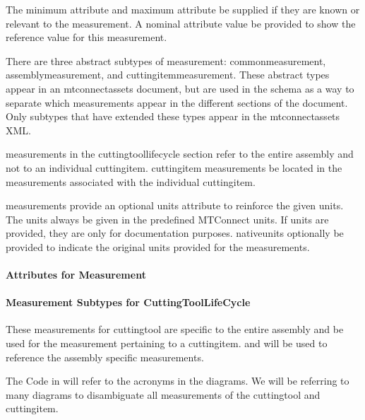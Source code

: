 The \gls{minimum attribute} and \gls{maximum attribute} \MAY be supplied if they are known or relevant to the \gls{measurement}.  A \gls{nominal attribute} value \MAY be provided to show the reference value for this \gls{measurement}.

There are three abstract subtypes of  \gls{measurement}: \gls{commonmeasurement}, \gls{assemblymeasurement}, and \gls{cuttingitemmeasurement}.  These abstract types \MUSTNOT appear in an \gls{mtconnectassets} document, but are used in the schema as a way to separate which measurements \MAY appear in the different sections of the document.  Only subtypes that have extended these types \MAY appear in the \gls{mtconnectassets} XML.

\Glspl{measurement} in the \gls{cuttingtoollifecycle} section \MUST refer to the entire assembly and not to an individual \gls{cuttingitem}. \gls{cuttingitem} measurements \MUST be located in the measurements associated with the individual \gls{cuttingitem}.

\Glspl{measurement}  \MAY provide an optional \gls{units} attribute to reinforce the given units.  The units \MUST always be given in the predefined MTConnect units.  If \gls{units} are provided, they are only for documentation purposes.  \gls{nativeunits} \MAY optionally be provided to indicate the original units provided for the measurements. 

\paragraph{Attributes for Measurement}\mbox{}



\paragraph{Measurement Subtypes for CuttingToolLifeCycle}\mbox{}

These \glspl{measurement} for \gls{cuttingtool} are specific to the entire assembly and \MUSTNOT be used for the \gls{measurement}  pertaining to a \gls{cuttingitem}.  and  will be used to reference the assembly specific \glspl{measurement}.

The Code in  will refer to the acronyms in the diagrams. We will be referring to many diagrams to disambiguate all measurements of the \gls{cuttingtool} and \gls{cuttingitem}. 

